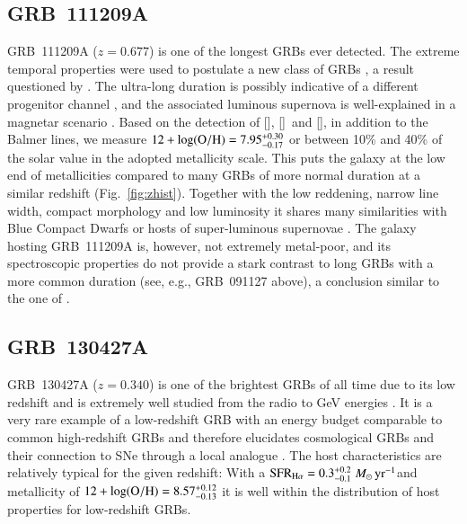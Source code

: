\documentclass[traditabstract, longauth]{aa}
\newcommand{\oh}{12+\log(\rm{O/H})}
\newcommand{\oii}{[\ion{O}{ii}]}
\newcommand{\oiii}{[\ion{O}{iii}]}
\newcommand{\neiii}{[\ion{Ne}{iii}]}
\newcommand{\Msunyr}{$M_\odot\,\rm{yr}^{-1}$}
\begin{document}
\begin{appendix}
\subsection{GRB~111209A} GRB~111209A ($z=0.677$) is one of the longest GRBs ever detected. The extreme temporal properties were used to postulate a new class of GRBs \citep{2013ApJ...766...30G, 2014ApJ...781...13L}, a result questioned by \citet{2013ApJ...778...54V}. The ultra-long duration is possibly indicative of a different progenitor channel \citep{2013ApJ...778...67N}, and the associated luminous supernova is well-explained in a magnetar scenario \citep{2015Kannsubm, 2015Greinersubm}. Based on the detection of \oii, \oiii\, and \neiii, in addition to the Balmer lines, we measure $\oh=7.95_{-0.17}^{+0.30}$ or between 10\% and 40\% of the solar value in the adopted metallicity scale. This puts the galaxy at the low end of metallicities compared to many GRBs of more normal duration at a similar redshift (Fig.~\ref{fig:zhist}). Together with the low reddening, narrow line width, compact morphology and low luminosity \citep{2014ApJ...781...13L} it shares many similarities with Blue Compact Dwarfs \citep[e.g.,][and references therein]{2003ApJS..147...29G} or hosts of super-luminous supernovae \citep[e.g.,][]{2014arXiv1409.8331L}. The galaxy hosting GRB~111209A is, however, not extremely metal-poor, and its spectroscopic properties do not provide a stark contrast to long GRBs with a more common duration (see, e.g., GRB~091127 above), a conclusion similar to the one of \citet{2014ApJ...781...13L}.

\subsection{GRB~130427A} GRB~130427A ($z=0.340$) is one of the brightest GRBs of all time due to its low redshift and is extremely well studied from the radio to GeV energies \citep[e.g.,][]{2014ApJ...781...37P, 2014Sci...343...42A, 2014MNRAS.444.3151V}. It is a very rare example of a low-redshift GRB with an energy budget comparable to common high-redshift GRBs and therefore elucidates cosmological GRBs and their connection to SNe through a local analogue \citep{2013ApJ...776...98X, 2014ApJ...792..115L, 2014A&A...567A..29M}. The host characteristics are relatively typical for the given redshift: With a $\rm{SFR}_{\rm{H\alpha}}= 0.3^{+0.2}_{-0.1}\,$\Msunyr and metallicity of $\oh=8.57_{-0.13}^{+0.12}$ it is well within the distribution of host properties for low-redshift GRBs.

\end{appendix}
\end{document}
